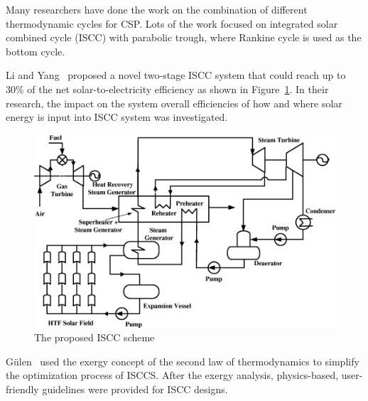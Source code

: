 Many researchers have done the work on the combination of different thermodynamic cycles for CSP. 
Lots of the work focused on integrated solar combined cycle (ISCC) with parabolic trough, where Rankine cycle is used as the bottom cycle.

Li and Yang~\cite{Li2014} proposed a novel two-stage ISCC system that could reach up to 30\% of the net solar-to-electricity efficiency as shown in Figure~\ref{fig:Li2014}. In their research, the impact on the system overall efficiencies of how and where solar energy is input into ISCC system was investigated.
\begin{figure}[!ht]
\centering
\includegraphics[width=.8\textwidth]{fig/Li2014.jpg}
\caption{The proposed ISCC scheme}\label{fig:Li2014}
\end{figure}

G\"{u}len~\cite{Gulen2015} used the exergy concept of the second law of thermodynamics to simplify the optimization process of ISCCS. After the exergy analysis, physics-based, user-friendly guidelines were provided for ISCC designs.

